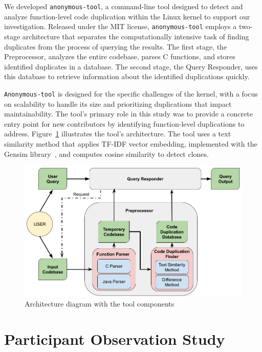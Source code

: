 \documentclass[10pt,conference]{IEEEtran}
\begin{document}
We developed \texttt{anonymous-tool}, a command-line tool designed to detect and analyze function-level code duplication within the Linux kernel to support our investigation. Released under the MIT license, \texttt{anonymous-tool} employs a two-stage architecture that separates the computationally intensive task of finding duplicates from the process of querying the results. The first stage, the Preprocessor, analyzes the entire codebase, parses C functions, and stores identified duplicates in a database. The second stage, the Query Responder, uses this database to retrieve information about the identified duplications quickly.

\texttt{Anonymous-tool} is designed for the specific challenges of the kernel, with a focus on scalability to handle its size and prioritizing duplications that impact maintainability. The tool's primary role in this study was to provide a concrete entry point for new contributors by identifying function-level duplications to address. Figure~\ref{fig:diagrama} illustrates the tool's architecture. The tool uses a text similarity method that applies TF-IDF vector embedding, implemented with the Gensim library~\cite{gensim}, and computes cosine similarity to detect clones.

\begin{figure}[ht]
\centering
\includegraphics[scale=0.275]{diagrama_mestrado}
\caption{Architecture diagram with the tool components
}
\label{fig:diagrama}
\end{figure}

\section{Participant Observation Study}
\label{sec:participant}
\end{document}
